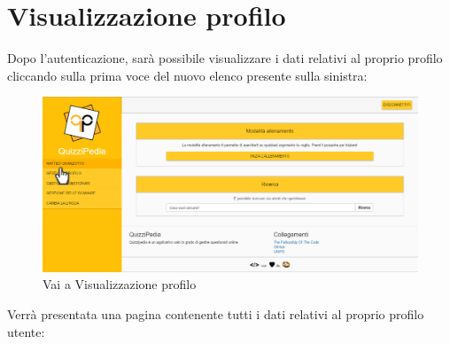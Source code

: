 \newpage
\section{Visualizzazione profilo}
Dopo l'autenticazione, sarà possibile visualizzare i dati relativi al proprio profilo cliccando sulla prima voce del nuovo elenco presente sulla sinistra:

\label{VaiProfilo}
\begin{figure}[ht]
	\centering
	\includegraphics[scale=0.33]{img/vai_profilo.png}
	\caption{Vai a Visualizzazione profilo}
\end{figure}
\FloatBarrier

Verrà presentata una pagina contenente tutti i dati relativi al proprio profilo utente: 